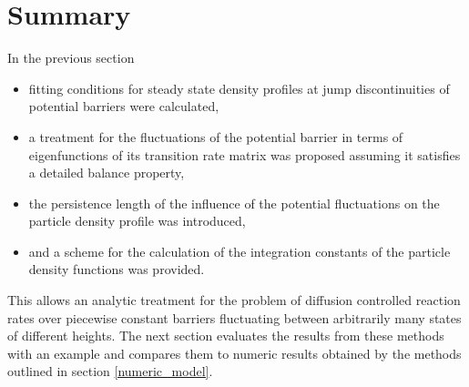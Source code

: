 \section{Summary}
In the previous section 
\begin{itemize}
    \item fitting conditions for steady state density profiles at jump discontinuities of potential barriers were calculated,
    \item a treatment for the fluctuations of the potential barrier in terms of eigenfunctions of its transition rate matrix was proposed assuming it satisfies a detailed balance property,
    \item  the persistence length of the influence of the potential fluctuations on the particle density profile was introduced,
    \item and a scheme for the calculation of the integration constants of the particle density functions was provided.
\end{itemize}
This allows an analytic treatment for the problem of diffusion controlled reaction rates over piecewise constant barriers fluctuating between arbitrarily many states of different heights. The next section evaluates the results from these methods with an example and compares them to numeric results obtained by the methods outlined in section \ref{numeric_model}.
\newpage

